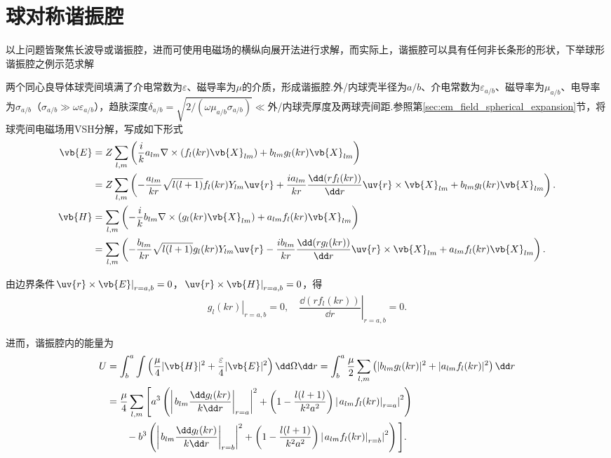 \section{球对称谐振腔}

以上问题皆聚焦长波导或谐振腔，进而可使用电磁场的横纵向展开法进行求解，而实际上，谐振腔可以具有任何非长条形的形状，下举球形谐振腔之例示范求解

两个同心良导体球壳间填满了介电常数为\(\varepsilon\)、磁导率为\(\mu\)的介质，形成谐振腔.外/内球壳半径为\(a/b\)、介电常数为\(\varepsilon_{a/b}\)、磁导率为\(\mu_{a/b}\)、电导率为\(\sigma_{a/b}\)（\(\sigma_{a/b} \gg \omega \varepsilon_{a/b}\)），趋肤深度\(\delta_{a/b} = \sqrt{2/(\omega \mu_{a/b} \sigma_{a/b})} \ll\)外/内球壳厚度及两球壳间距.参照第\cref{sec:em_field_spherical_expansion}节，将球壳间电磁场用VSH分解，写成如下形式
\begin{align*}
	\vb{E} &= Z \sum_{l,m} \left( \dfrac{i}{k} a_{lm} \nabla \times \left( f_l(kr) \vb{X}_{lm} \right) + b_{lm} g_l(kr) \vb{X}_{lm} \right) \\
	&= Z \sum_{l,m} \left( -\dfrac{a_{lm}}{kr} \sqrt{l(l+1)} f_l(kr) Y_{lm} \uv{r} + \dfrac{i a_{lm}}{kr} \dfrac{\dd(r f_l(kr))}{\dd r} \uv{r} \times \vb{X}_{lm} + b_{lm} g_l(kr) \vb{X}_{lm} \right).\\
	\vb{H} &= \sum_{l,m} \left( -\dfrac{i}{k} b_{lm} \nabla \times \left( g_l(kr) \vb{X}_{lm} \right) + a_{lm} f_l(kr) \vb{X}_{lm} \right) \\
	&= \sum_{l,m} \left( -\dfrac{b_{lm}}{kr} \sqrt{l(l+1)} g_l(kr) Y_{lm} \uv{r} - \dfrac{i b_{lm}}{kr} \dfrac{\dd(r g_l(kr))}{\dd r} \uv{r} \times \vb{X}_{lm} + a_{lm} f_l(kr) \vb{X}_{lm} \right).
\end{align*}

由边界条件\(\left. \uv{r} \times \vb{E} \right|_{r=a,b} = 0\)，\(\left. \uv{r} \times \vb{H} \right|_{r=a,b} = 0\)，得
\begin{align*}
	\left. g_l(kr) \right|_{r=a,b} = 0, \quad \left. \dfrac{\dd(r f_l(kr))}{\dd r} \right|_{r=a,b} = 0.
\end{align*}

进而，谐振腔内的能量为
\begin{align*}
	U &= \int_b^a \int \left( \dfrac{\mu}{4} |\vb{H}|^2 + \dfrac{\varepsilon}{4} |\vb{E}|^2 \right) \dd \Omega \dd r = \int_b^a \dfrac{\mu}{2} \sum_{l,m} \left( |b_{lm} g_l(kr)|^2 + |a_{lm} f_l(kr)|^2 \right) \dd r \\
	&= \dfrac{\mu}{4} \sum_{l,m} \Bigg[ a^3 \left( \left| \left. b_{lm} \dfrac{\dd  g_l(kr)}{k \dd r} \right|_{r=a} \right|^2 + \left( 1 - \dfrac{l(l+1)}{k^2 a^2} \right) \left| \left. a_{lm} f_l(kr) \right|_{r=a} \right|^2 \right)\\ &\qquad- b^3\left( \left| \left. b_{lm} \dfrac{\dd  g_l(kr)}{k \dd r} \right|_{r=b} \right|^2 + \left( 1 - \dfrac{l(l+1)}{k^2 a^2} \right) \left| \left. a_{lm} f_l(kr) \right|_{r=b} \right|^2 \right) \Bigg].
\end{align*}

